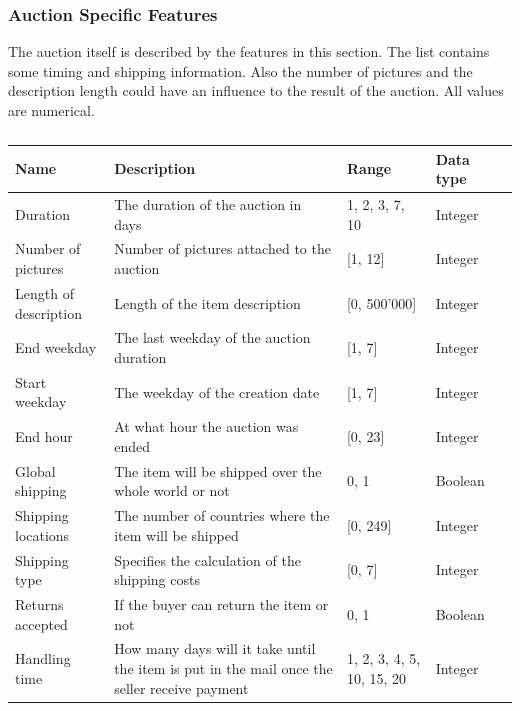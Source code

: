 \subsubsection{Auction Specific Features}
The auction itself is described by the features in this section. The list contains some timing and shipping information. Also the number of pictures and the description length could have an influence to the result of the auction. All values are numerical.
\begin{table}[h!]
	\begin{center}
	\begin{tabular}{| l | p{5cm} | l | l | l |}
		\hline
		Name & Description &  Range & Data type \\
		\hline
		Duration & The duration of the auction in days & {1, 2, 3, 7, 10} & Integer \\
		\hline
		Number of pictures & Number of pictures attached to the auction & [1, 12] & Integer \\
		\hline
		Length of description & Length of the item description & [0, 500'000] & Integer \\
		\hline
		End weekday & The last weekday of the auction duration & [1, 7] & Integer \\
		\hline
		Start weekday & The weekday of the creation date & [1, 7] & Integer \\
		\hline
		End hour & At what hour the auction was ended & [0, 23] & Integer \\
		\hline
		Global shipping & The item will be shipped over the whole world or not & {0, 1} & Boolean \\
		\hline
		Shipping locations & The number of countries where the item will be shipped & [0, 249] & Integer \\
		\hline
		Shipping type & Specifies the calculation of the shipping costs & [0, 7] & Integer \\
		\hline
		Returns accepted & If the buyer can return the item or not & {0, 1} & Boolean \\
		\hline
		Handling time & How many days will it take until the item is put in the mail once the seller receive payment & {1, 2, 3, 4, 5, 10, 15, 20} & Integer \\
		\hline
	\end{tabular}
	\end{center}
	\caption{}
\end{table}
